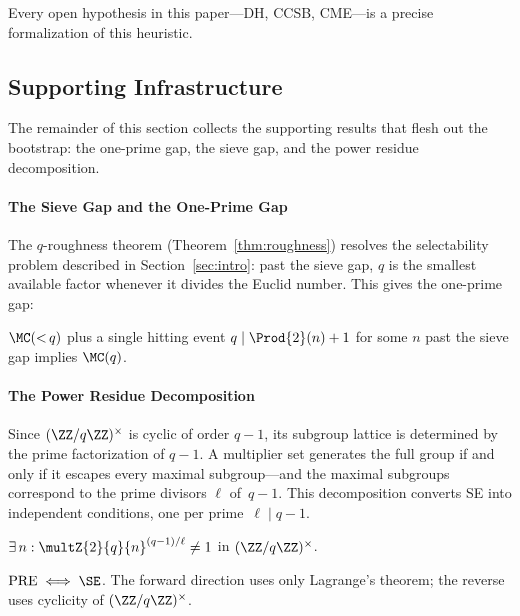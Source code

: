 Every open hypothesis in this paper---DH, CCSB, CME---is a precise
formalization of this heuristic.

\subsection{Supporting Infrastructure}

The remainder of this section collects the supporting results that
flesh out the bootstrap: the one-prime gap, the sieve gap, and the power residue decomposition.

\paragraph{The Sieve Gap and the One-Prime Gap}

The $q$-roughness theorem (Theorem~\ref{thm:roughness}) resolves the
selectability problem described in Section~\ref{sec:intro}: past the
sieve gap, $q$ is the smallest available factor whenever it divides
the Euclid number.  This gives the one-prime gap:

\begin{theorem}
\label{thm:one-prime-gap}
$\MC({<}\,q)$ plus a single hitting event
$q \mid \Prod{2}(n)+1$ for some $n$ past the sieve gap
implies $\MC(q)$.
\end{theorem}

\paragraph{The Power Residue Decomposition}

Since $(\ZZ/q\ZZ)^\times$ is cyclic of order $q\!-\!1$, its subgroup
lattice is determined by the prime factorization of $q\!-\!1$.  A
multiplier set generates the full group if and only if it escapes every
maximal subgroup---and the maximal subgroups correspond to the prime
divisors $\ell$ of~$q\!-\!1$.  This decomposition converts SE into
independent conditions, one per prime~$\ell \mid q\!-\!1$.

\begin{property}
$\exists\, n : \multZ{2}{q}{n}^{(q-1)/\ell} \neq 1$ in $(\ZZ/q\ZZ)^\times$.
\end{property}

\begin{theorem}
$\mathrm{PRE} \;\Longleftrightarrow\; \SE$.
The forward direction uses only Lagrange's theorem; the reverse uses
cyclicity of $(\ZZ/q\ZZ)^\times$.
\end{theorem}

